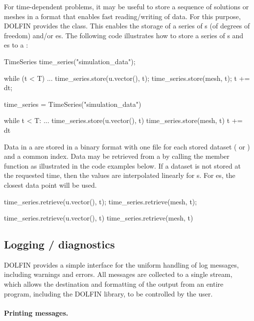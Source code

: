 For time-dependent problems, it may be useful to store a
sequence of solutions or meshes in a format that enables fast
reading/writing of data. For this purpose, DOLFIN provides the
 class. This enables the storage of a series of
s (of degrees of freedom) and/or es. The
following code illustrates how to store a series of s and
es to a :
\begin{c++}
TimeSeries time_series("simulation_data");

while (t < T)
{
  ...
  time_series.store(u.vector(), t);
  time_series.store(mesh, t);
  t += dt;
}
\end{c++}
%
\begin{python}
time_series = TimeSeries("simulation_data")

while t < T:
    ...
    time_series.store(u.vector(), t)
    time_series.store(mesh, t)
    t += dt
\end{python}
Data in a  are stored in a binary format with one file
for each stored dataset ( or ) and a common
index. Data may be retrieved from a  by calling the
 member function as illustrated in the code examples
below. If a dataset is not stored at the requested time, then the
values are interpolated linearly for s. For es,
the closest data point will be used.
\begin{c++}
time_series.retrieve(u.vector(), t);
time_series.retrieve(mesh, t);
\end{c++}
\begin{python}
time_series.retrieve(u.vector(), t)
time_series.retrieve(mesh, t)
\end{python}

\subsection{Logging / diagnostics}

DOLFIN provides a simple interface for the uniform handling of log
messages, including warnings and errors. All messages are collected to a
single stream, which allows the destination and formatting of the output
from an entire program, including the DOLFIN library, to be controlled
by the user.

\paragraph{Printing messages.}

